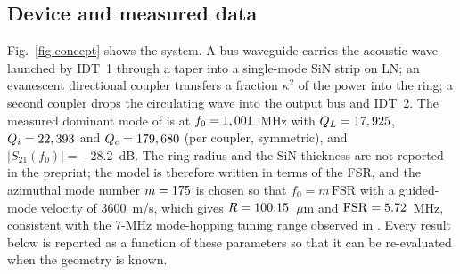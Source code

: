 \documentclass[journal]{IEEEtran}
\begin{document}
\subsection{Device and measured data}
Fig.~\ref{fig:concept} shows the system. A bus waveguide carries the acoustic wave launched by IDT~1 through a taper into a single-mode SiN strip on LN; an evanescent directional coupler transfers a fraction $\kappa^2$ of the power into the ring; a second coupler drops the circulating wave into the output bus and IDT~2. The measured dominant mode of \cite{ji2026} is at $f_0=1,001$~MHz with $Q_L=17,925$, $Q_i=22,393$ and $Q_c=179,680$ (per coupler, symmetric), and $|S_{21}(f_0)|=-28.2$~dB. The ring radius and the SiN thickness are not reported in the preprint; the model is therefore written in terms of the FSR, and the azimuthal mode number $m=175$ is chosen so that $f_0=m\,\mathrm{FSR}$ with a guided-mode velocity of 3600~m/s, which gives $R=100.15$~$\mu$m and $\mathrm{FSR}=5.72$~MHz, consistent with the 7-MHz mode-hopping tuning range observed in \cite{ji2026}. Every result below is reported as a function of these parameters so that it can be re-evaluated when the geometry is known.
\end{document}
